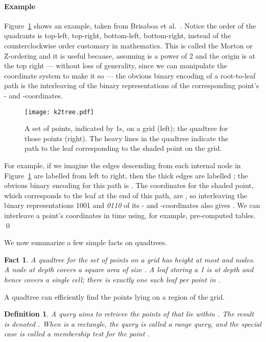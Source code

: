 \documentclass{elsarticle}
\newtheorem{fact}[theorem]{Fact}
\newtheorem{definition}{Definition}
\newcommand {\changed}[1]{#1}
\newenvironment{example}{\paragraph{Example}}{\qed \medskip }
\begin{document}
\begin{example}
Figure~\ref{fig:tree} shows an example, taken from Brisaboa et al.~\cite{BCBNP20}.  Notice the order of the quadrants is top-left, top-right, bottom-left, bottom-right, instead of the counterclockwise order customary in mathematics.  This is called the Morton or Z-ordering and it is useful because, assuming  is a power of 2 and the origin is at the top right --- without loss of generality, since we can manipulate the coordinate system to make it so --- the obvious binary encoding of a root-to-leaf path is the interleaving of the binary representations of the corresponding point's - and -coordinates.

\begin{figure}
\begin{center}
\texttt{[image: k2tree.pdf]}
\caption{A set of points, indicated by 1s, on a  grid (left); the quadtree for those points (right).  The heavy lines in the quadtree indicate the path to the leaf corresponding to the shaded point on the grid.}
\label{fig:tree}
\end{center}
\end{figure}

For example, if we imagine the edges descending from each internal node in Figure~\ref{fig:tree} are labelled  from left to right, then the thick edges are labelled ; the obvious binary encoding for this path is .  The coordinates for the shaded point, which corresponds to the leaf at the end of this path, are , so interleaving the binary representations 1001 and {\it 0110} of its - and -coordinates also gives . \changed{We can interleave a point's coordinates in  time using, for example, pre-computed tables}.
\end{example}

We now summarize a few simple facts on quadtrees.

\begin{fact}
\label{fact:basics}
A quadtree for the set of points  on a grid  has height at most  and  nodes. A node at depth  covers a square area of size . A leaf storing a 1 is at depth  and hence covers
a single cell; there is exactly one such leaf per point in .
\end{fact}

A quadtree can efficiently find the points lying on a region of the grid.

\begin{definition}
A {\em query}  aims to retrieve the points of 
that lie within . The result is denoted . When  is a 
rectangle, the query is called a {\em range query}, and the special
case  is called a {\em membership test}
for the point .  
\end{definition}
\end{document}
